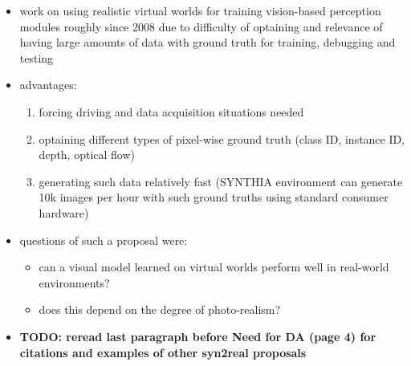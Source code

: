 \documentclass[]{article}
\newcommand{\todo}[1]{{\color{red}\bf{TODO: #1}}}
\begin{document}
\begin{itemize}
	\item work on using realistic virtual worlds for training vision-based perception modules roughly since 2008 due to difficulty of optaining and relevance of having large amounts of data with ground truth for training, debugging and testing
	\item advantages:
	\begin{enumerate}
		\item forcing driving and data acquisition situations needed
		\item optaining different types of pixel-wise ground truth (class ID, instance ID, depth, optical flow)
		\item generating such data relatively fast (SYNTHIA environment can generate 10k images per hour with such ground truths using standard consumer hardware)
	\end{enumerate}
	\item questions of such a proposal were:
	\begin{itemize}
		\item can a visual model learned on virtual worlds perform well in real-world environments?
		\item does this depend on the degree of photo-realism?
	\end{itemize}
	\item \todo{reread last paragraph before Need for DA (page 4) for citations and examples of other syn2real proposals}
	
\end{itemize}
\end{document}
